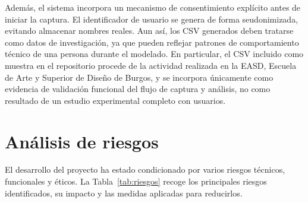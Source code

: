 Además, el sistema incorpora un mecanismo de consentimiento explícito antes de iniciar la captura. El identificador de usuario se genera de forma seudonimizada, evitando almacenar nombres reales. Aun así, los CSV generados deben tratarse como datos de investigación, ya que pueden reflejar patrones de comportamiento técnico de una persona durante el modelado. En particular, el CSV incluido como muestra en el repositorio procede de la actividad realizada en la EASD, Escuela de Arte y Superior de Diseño de Burgos, y se incorpora únicamente como evidencia de validación funcional del flujo de captura y análisis, no como resultado de un estudio experimental completo con usuarios.

\section{Análisis de riesgos}
\label{sec:a-riesgos}

El desarrollo del proyecto ha estado condicionado por varios riesgos técnicos, funcionales y éticos. La Tabla~\ref{tab:riesgos} recoge los principales riesgos identificados, su impacto y las medidas aplicadas para reducirlos.

